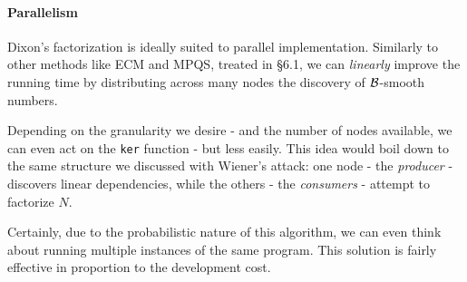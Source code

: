 \paragraph{Parallelism}

Dixon's factorization is ideally suited to parallel implementation. Similarly to
other methods like ECM and MPQS, treated in \cite{brent:parallel} \S 6.1,
we can \emph{linearly} improve the running time by distributing across many
nodes the discovery of $\mathcal{B}$-smooth numbers.

Depending on the granularity we desire - and the number of nodes available, we
can even act on the \texttt{ker} function - but less easily.
This idea would boil down to the same structure we discussed with Wiener's attack:
one node - the \emph{producer} - discovers linear dependencies, while the others
- the \emph{consumers} - attempt to factorize $N$.

Certainly, due to the probabilistic nature of this algorithm, we can even think
about running multiple instances of the same program. This solution is fairly
effective in proportion to the development cost.


